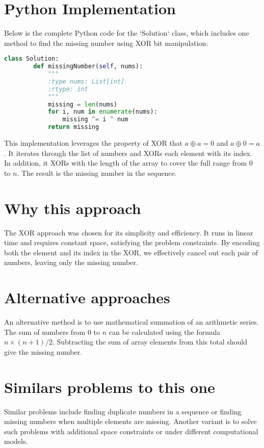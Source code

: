 \section*{Python Implementation}
Below is the complete Python code for the `Solution` class, which includes one method to find the missing number using XOR bit manipulation:

\begin{fullwidth}
\begin{lstlisting}[language=Python]
	class Solution:
		def missingNumber(self, nums):
			"""
			:type nums: List[int]
			:rtype: int
			"""
			missing = len(nums)
			for i, num in enumerate(nums):
				missing ^= i ^ num
			return missing
\end{lstlisting}

\end{fullwidth}

This implementation leverages the property of XOR that \(a \oplus a = 0\) and \(a \oplus 0 = a\). It iterates through the list of numbers and XORs each element with its index. In addition, it XORs with the length of the array to cover the full range from \(0\) to \(n\). The result is the missing number in the sequence.

\section*{Why this approach}
The XOR approach was chosen for its simplicity and efficiency. It runs in linear time and requires constant space, satisfying the problem constraints. By encoding both the element and its index in the XOR, we effectively cancel out each pair of numbers, leaving only the missing number.

\section*{Alternative approaches}
An alternative method is to use mathematical summation of an arithmetic series. The sum of numbers from \(0\) to \(n\) can be calculated using the formula \(n \times (n + 1) / 2\). Subtracting the sum of array elements from this total should give the missing number.

\section*{Similars problems to this one}
Similar problems include finding duplicate numbers in a sequence or finding missing numbers when multiple elements are missing. Another variant is to solve such problems with additional space constraints or under different computational models.

